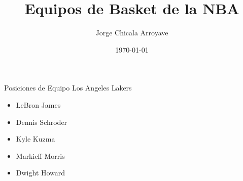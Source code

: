 \documentclass[a4paper,11pt]{article}
\begin{document}
\title{Equipos de Basket de la NBA}
\author{Jorge Chicala Arroyave}
\date{\today}
\maketitle
\begin{minipage}[t]{0.5\textwidth}
\begin{bf}
Posiciones de Equipo Los Angeles Lakers
\end{bf}
\begin{itemize}
\item LeBron James
\item Dennis Schroder
\item Kyle Kuzma
\item Markieff Morris
\item Dwight Howard
\end{itemize}
\end{minipage}
\end{document}
